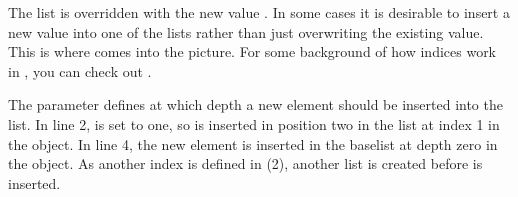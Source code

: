 \documentclass[a4paper,10pt,english]{sphinxmanual}
\begin{document}
\sphinxAtStartPar
The list \sphinxcode{\sphinxupquote{{[}5, 6{]}}} is overridden with the new value . In some cases it is desirable to insert a new value into one of the lists rather than just overwriting the existing value. This is where  comes into the picture. For some background of how \sphinxhyphen{}indices work in , you can check out {\hyperref[\detokenize{README:correctly-handling-list-indices}]{}}.

\begin{sphinxVerbatim}[commandchars=\\\{\},numbers=left,firstnumber=1,stepnumber=1]
  \PYG{p}{[} \PYG{p}{[}  \PYG{p}{[} \PYG{p}{]} \PYG{p}{]}\PYG{p}{]} 
     
     
\end{sphinxVerbatim}

\sphinxAtStartPar
The parameter  defines at which depth a new element should be inserted into the list. In line 2,  is set to one, so  is inserted in position two in the list at index 1 in the \sphinxhyphen{}object. In line 4, the new element is inserted in the base\sphinxhyphen{}list at depth zero in the \sphinxhyphen{}object. As another index is defined in  (2), another list is created before  is inserted.
\end{document}
